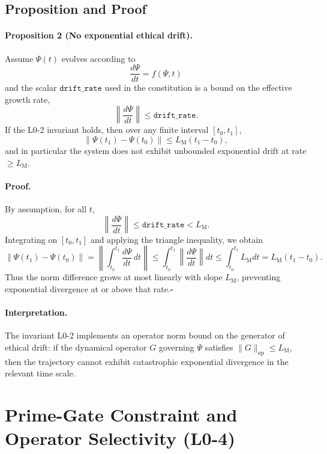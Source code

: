 \documentclass[11pt]{article}
\begin{document}
\subsection{Proposition and Proof}

\paragraph{Proposition 2 (No exponential ethical drift).}
Assume \(\Psi(t)\) evolves according to
\[
  \frac{d\Psi}{dt} = f(\Psi, t)
\]
and the scalar \(\texttt{drift\_rate}\) used in the constitution is a bound on the effective growth rate,
\[
  \left\lVert \frac{d\Psi}{dt} \right\rVert \le \texttt{drift\_rate}.
\]
If the L0-2 invariant holds, then over any finite interval \([t_0, t_1]\),
\[
  \lVert \Psi(t_1) - \Psi(t_0)\rVert \le L_{\mathrm{M}} (t_1 - t_0),
\]
and in particular the system does not exhibit unbounded exponential drift at rate \(\ge L_{\mathrm{M}}\).

\paragraph{Proof.}
By assumption, for all \(t\),
\[
  \left\lVert \frac{d\Psi}{dt} \right\rVert \le \texttt{drift\_rate} < L_{\mathrm{M}}.
\]
Integrating on \([t_0, t_1]\) and applying the triangle inequality, we obtain
\[
  \lVert \Psi(t_1) - \Psi(t_0)\rVert
  = \left\lVert \int_{t_0}^{t_1} \frac{d\Psi}{dt} \, dt \right\rVert
  \le \int_{t_0}^{t_1} \left\lVert \frac{d\Psi}{dt} \right\rVert dt
  \le \int_{t_0}^{t_1} L_{\mathrm{M}} dt
  = L_{\mathrm{M}} (t_1 - t_0).
\]
Thus the norm difference grows at most linearly with slope \(L_{\mathrm{M}}\), preventing exponential divergence at or above that rate.\(\square\)

\paragraph{Interpretation.}
The invariant L0-2 implements an operator norm bound on the generator of ethical drift: if the dynamical operator \(G\) governing \(\Psi\) satisfies \(\lVert G\rVert_{\mathrm{op}} \le L_{\mathrm{M}}\), then the trajectory cannot exhibit catastrophic exponential divergence in the relevant time scale.

\section{Prime-Gate Constraint and Operator Selectivity (L0-4)}
\end{document}

